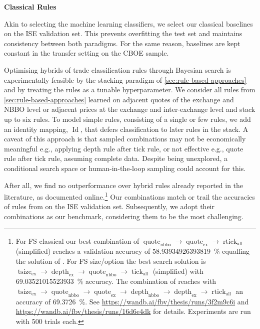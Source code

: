 \textbf{Classical Rules}

Akin to selecting the machine learning classifiers, we select our classical baselines on the \gls{ISE} validation set. This prevents \gls{overfitting} the test set and maintains consistency between both paradigms. For the same reason, baselines are kept constant in the transfer setting on the \gls{CBOE} sample.

Optimising hybrids of trade classification rules through Bayesian search is experimentally feasible by the stacking paradigm of \cref{sec:rule-based-approaches} and by treating the rules as a tunable hyperparameter. We consider all rules from \cref{sec:rule-based-approaches} learned on adjacent quotes of the exchange and \gls{NBBO} level or adjacent prices at the exchange and inter-exchange level and stack up to six rules. To model simple rules, consisting of a single or few rules, we add an identity mapping, $\operatorname{Id}$, that defers classification to later rules in the stack. A caveat of this approach is that sampled combinations may not be economically meaningful e.g., applying depth rule after tick rule, or not effective e.g., quote rule after tick rule, assuming complete data. Despite being unexplored, a conditional search space or human-in-the-loop sampling could account for this.

After all, we find no outperformance over hybrid rules already reported in the literature, as documented online.\footnote{For \gls{FS} classical our best combination of $\operatorname{quote}_{\mathrm{nbbo}} \to \operatorname{quote}_{\mathrm{ex}} \to \operatorname{rtick}_{\mathrm{all}}$ (simplified) reaches a validation accuracy of \SI{58.93934926393819}{\percent} equalling the solution of \textcite[][12]{grauerOptionTradeClassification2022}. For \gls{FS} size/option the best search solution is $\operatorname{tsize}_{\mathrm{ex}} \to \operatorname{depth}_{\mathrm{ex}} \to \operatorname{quote}_{\mathrm{nbbo}} \to \operatorname{tick}_{\mathrm{all}}$ (simplified) with \SI{69.03521015523933}{\percent} accuracy. The combination of \textcite[][14]{grauerOptionTradeClassification2022} reaches with $\operatorname{tsize}_{\mathrm{ex}} \to \operatorname{quote}_{\mathrm{nbbo}} \to \operatorname{quote}_{\mathrm{ex}} \to \operatorname{depth}_{\mathrm{nbbo}} \to \operatorname{depth}_{\mathrm{ex}} \to \operatorname{rtick}_{\mathrm{all}}$ an accuracy of \SI{69.3726}{\percent}. See \url{https://wandb.ai/fbv/thesis/runs/3f2m9c6i} and \url{https://wandb.ai/fbv/thesis/runs/16d6e4dk} for details. Experiments are run with \num{500} trials each.} Our combinations match or trail the accuracies of rules from \textcite[][12--14]{grauerOptionTradeClassification2022} on the \gls{ISE} validation set. Subsequently, we adopt their combinations as our benchmark, considering them to be the most challenging.


